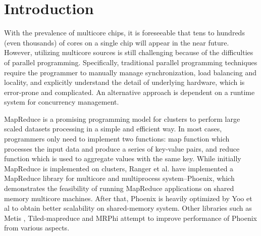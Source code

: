 \section{Introduction}
\label{sec:intro}



With the prevalence of multicore chips, it is foreseeable that tens to hundreds (even thousands) of cores on a single chip will appear in the near future\cite{Borkar2007core}.
However, utilizing multicore sources is still challenging because of the difficulties of parallel programming.
Specifically, traditional parallel programming techniques require the programmer to manually manage synchronization, load balancing and locality, and explicitly understand the detail of underlying hardware, which is error-prone and complicated. %
An alternative approach is dependent on a runtime system for concurrency management. 

MapReduce\cite{dean2004mapreduce} is a promising programming model for clusters to perform large scaled datasets processing in a simple and efficient way.
In most cases, programmers only need to implement two functions: 
map function which processes the input data and produce  a series of key-value pairs, and reduce function which is used to aggregate values with the same key.
While initially MapReduce is implemented on clusters, Ranger et al. have implemented a MapReduce library for multicore and multiprocess system--Phoenix\cite{ranger2007phoenix}, which demonstrates the feasibility of running MapReduce applications on shared memory multicore machines.
After that, Phoenix is heavily optimized by Yoo et al\cite{yoo2009phoenix2} to obtain better scalability on shared-memory system.
Other libraries such as Metis\cite{mao2010metis} , Tiled-mapreduce\cite{chen2010tiled} and MRPhi\cite{lu2013mrphi} attempt to improve performance of Phoenix from various aspects.


